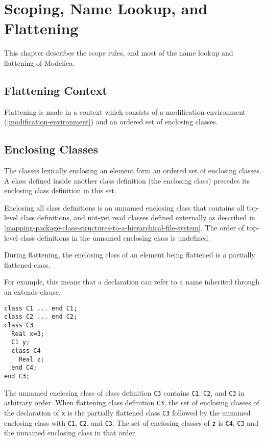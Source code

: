 \chapter{Scoping, Name Lookup, and Flattening}\label{scoping-name-lookup-and-flattening}

This chapter describes the scope rules, and most of the name lookup and
flattening of Modelica.

\section{Flattening Context}\label{flattening-context}

Flattening is made in a context which consists of a modification
environment (\cref{modification-environment}) and an ordered set of enclosing classes.

\section{Enclosing Classes}\label{enclosing-classes}

The classes lexically enclosing an element form an ordered set of
enclosing classes. A class defined inside another class definition (the
enclosing class) precedes its enclosing class definition in this set.

Enclosing all class definitions is an unnamed enclosing class that
contains all top-level class definitions, and not-yet read classes
defined externally as described in \cref{mapping-package-class-structures-to-a-hierarchical-file-system}. The order of
top-level class definitions in the unnamed enclosing class is undefined.

During flattening, the enclosing class of an element being flattened is
a partially flattened class.

\begin{nonnormative}
For example, this means that a declaration can refer to a name inherited through an extends-clause.
\end{nonnormative}

\begin{example}
\begin{lstlisting}[language=modelica]
class C1 ... end C1;
class C2 ... end C2;
class C3
  Real x=3;
  C1 y;
  class C4
    Real z;
  end C4;
end C3;
\end{lstlisting}

The unnamed enclosing class of class definition \lstinline!C3! contains \lstinline!C1!,
\lstinline!C2!, and \lstinline!C3! in arbitrary order. When flattening class definition \lstinline!C3!, the
set of enclosing classes of the declaration of \lstinline!x! is the partially
flattened class \lstinline!C3! followed by the unnamed enclosing class with \lstinline!C1!, \lstinline!C2!,
and \lstinline!C3!. The set of enclosing classes of \lstinline!z! is \lstinline!C4!, \lstinline!C3! and the unnamed
enclosing class in that order.
\end{example}

